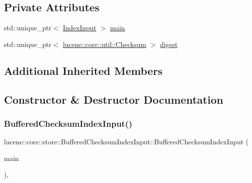 \subsection*{Private Attributes}
\begin{DoxyCompactItemize}
\item 
std\+::unique\+\_\+ptr$<$ \mbox{\hyperlink{classlucene_1_1core_1_1store_1_1IndexInput}{Index\+Input}} $>$ \mbox{\hyperlink{classlucene_1_1core_1_1store_1_1BufferedChecksumIndexInput_ab57fb18272b384d6cb10c59408103e0f}{main}}
\item 
std\+::unique\+\_\+ptr$<$ \mbox{\hyperlink{classlucene_1_1core_1_1util_1_1Checksum}{lucene\+::core\+::util\+::\+Checksum}} $>$ \mbox{\hyperlink{classlucene_1_1core_1_1store_1_1BufferedChecksumIndexInput_a03959da784c91f969b5541e9c375cdb5}{digest}}
\end{DoxyCompactItemize}
\subsection*{Additional Inherited Members}


\subsection{Constructor \& Destructor Documentation}
\mbox{\label{classlucene_1_1core_1_1store_1_1BufferedChecksumIndexInput_afd7384af7f99e07f1a5df4a66ed3aa54}} 
\subsubsection{\texorpdfstring{Buffered\+Checksum\+Index\+Input()}{BufferedChecksumIndexInput()}}
{\footnotesize\ttfamily lucene\+::core\+::store\+::\+Buffered\+Checksum\+Index\+Input\+::\+Buffered\+Checksum\+Index\+Input (\begin{DoxyParamCaption}\item[{std\+::unique\+\_\+ptr$<$ \mbox{\hyperlink{classlucene_1_1core_1_1store_1_1IndexInput}{Index\+Input}} $>$ \&\&}]{main }\end{DoxyParamCaption})\hspace{0.3cm}{\ttfamily [inline]}, {\ttfamily [explicit]}}



